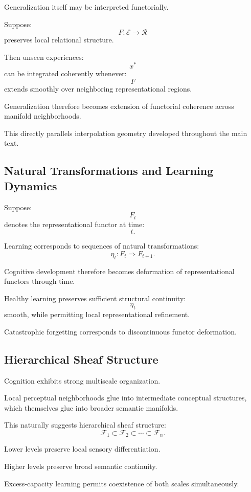 \documentclass[12pt,a4paper]{article}
\begin{document}
Generalization itself may be interpreted functorially.

Suppose:
\[
F :
\mathcal{E}
\rightarrow
\mathcal{R}
\]
preserves local relational structure.

Then unseen experiences:
\[
x^\ast
\]
can be integrated coherently whenever:
\[
F
\]
extends smoothly over neighboring representational regions.

Generalization therefore becomes extension of functorial coherence across manifold neighborhoods.

This directly parallels interpolation geometry developed throughout the main text.

\subsection{Natural Transformations and Learning Dynamics}

Suppose:
\[
F_t
\]
denotes the representational functor at time:
\[
t.
\]

Learning corresponds to sequences of natural transformations:
\[
\eta_t :
F_t
\Rightarrow
F_{t+1}.
\]

Cognitive development therefore becomes deformation of representational functors through time.

Healthy learning preserves sufficient structural continuity:
\[
\eta_t
\]
smooth,
while permitting local representational refinement.

Catastrophic forgetting corresponds to discontinuous functor deformation.

\subsection{Hierarchical Sheaf Structure}

Cognition exhibits strong multiscale organization.

Local perceptual neighborhoods glue into intermediate conceptual structures, which themselves glue into broader semantic manifolds.

This naturally suggests hierarchical sheaf structure:
\[
\mathcal{F}_1
\subset
\mathcal{F}_2
\subset
\cdots
\subset
\mathcal{F}_n.
\]

Lower levels preserve local sensory differentiation.

Higher levels preserve broad semantic continuity.

Excess-capacity learning permits coexistence of both scales simultaneously.
\end{document}
